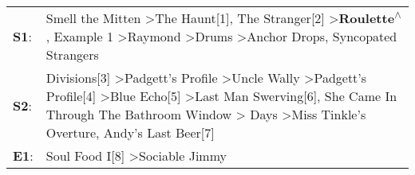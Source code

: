 \begin{supertabular}{p{0.03\textwidth}p{0.92\textwidth}}
 \textbf{S1}:  &                                                                                                                 Smell the Mitten\textsuperscript{} \textgreater \enspace The Haunt[1]\textsuperscript{}, \enspace The Stranger[2]\textsuperscript{} \textgreater \enspace \textbf{Roulette\textsuperscript{$\wedge$}}, \enspace Example 1\textsuperscript{} \textgreater \enspace Raymond\textsuperscript{} \textgreater \enspace Drums\textsuperscript{} \textgreater \enspace Anchor Drops\textsuperscript{}, \enspace Syncopated Strangers\textsuperscript{}  \enspace  \\
 \textbf{S2}:  &  Divisions[3]\textsuperscript{} \textgreater \enspace Padgett's Profile\textsuperscript{} \textgreater \enspace Uncle Wally\textsuperscript{} \textgreater \enspace Padgett's Profile[4]\textsuperscript{} \textgreater \enspace Blue Echo[5]\textsuperscript{} \textgreater \enspace Last Man Swerving[6]\textsuperscript{}, \enspace She Came In Through The Bathroom Window\textsuperscript{} \textgreater {} Days\textsuperscript{} \textgreater \enspace Miss Tinkle's Overture\textsuperscript{}, \enspace Andy's Last Beer[7]\textsuperscript{}  \enspace  \\
 \textbf{E1}:  &                                                                                                                                                                                                                                                                                                                                                                                                                                                                         Soul Food I[8]\textsuperscript{} \textgreater \enspace Sociable Jimmy\textsuperscript{}  \enspace  \\
\end{supertabular}
